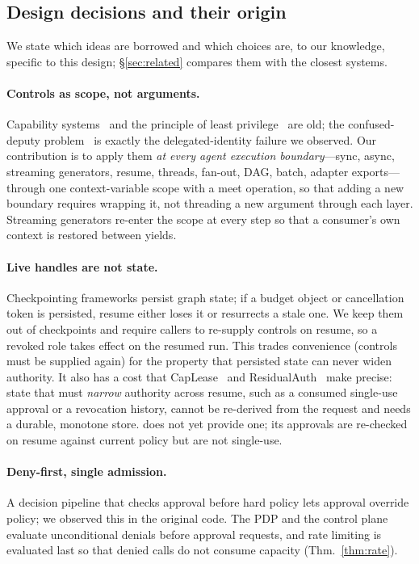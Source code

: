 \subsection{Design decisions and their origin}
\label{sec:design}
We state which ideas are borrowed and which choices are, to our knowledge, specific to this design; \S\ref{sec:related} compares them with the closest systems.

\paragraph{Controls as scope, not arguments.} Capability systems~\cite{dennis1966programming,miller2006robust} and the principle of least privilege~\cite{saltzer1975protection} are old; the confused-deputy problem~\cite{hardy1988confused} is exactly the delegated-identity failure we observed. Our contribution is to apply them \emph{at every agent execution boundary}---sync, async, streaming generators, resume, threads, fan-out, DAG, batch, adapter exports---through one context-variable scope with a meet operation, so that adding a new boundary requires wrapping it, not threading a new argument through each layer. Streaming generators re-enter the scope at every step so that a consumer's own context is restored between yields.

\paragraph{Live handles are not state.} Checkpointing frameworks persist graph state; if a budget object or cancellation token is persisted, resume either loses it or resurrects a stale one. We keep them out of checkpoints and require callers to re-supply controls on resume, so a revoked role takes effect on the resumed run. This trades convenience (controls must be supplied again) for the property that persisted state can never widen authority. It also has a cost that CapLease~\cite{xu2026caplease} and ResidualAuth~\cite{choi2026residualauth} make precise: state that must \emph{narrow} authority across resume, such as a consumed single-use approval or a revocation history, cannot be re-derived from the request and needs a durable, monotone store. \method{} does not yet provide one; its approvals are re-checked on resume against current policy but are not single-use.

\paragraph{Deny-first, single admission.} A decision pipeline that checks approval before hard policy lets approval override policy; we observed this in the original code. The PDP and the control plane evaluate unconditional denials before approval requests, and rate limiting is evaluated last so that denied calls do not consume capacity (Thm.~\ref{thm:rate}).

